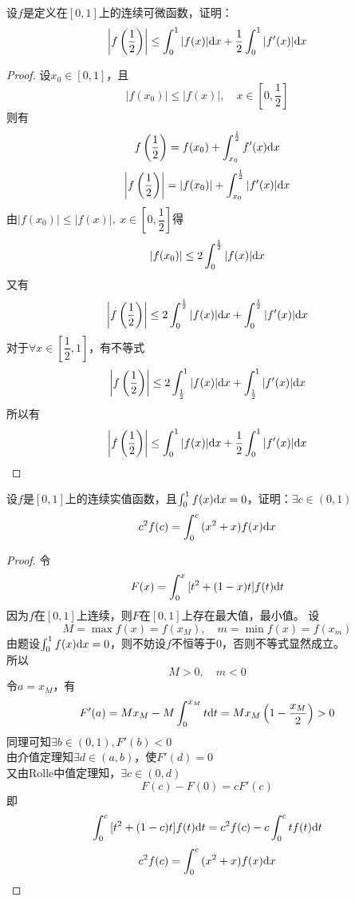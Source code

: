 \begin{proposition}
    
    设$f$是定义在$[0,1]$上的连续可微函数，证明：
    $$\left|f\left(\dfrac{1}{2}\right)\right| \leq \int_{0}^{1}{|f(x)|}\mathrm{d} x + \dfrac{1}{2} \int_{0}^{1}{|f'(x)|}\mathrm{d} x$$

\end{proposition}

\begin{proof}

    设$x_0 \in [0,1]$，且
    $$|f(x_0)| \leq |f(x)|, \quad x \in \left[0,\dfrac{1}{2}\right]$$
    则有
    $$f\left(\dfrac{1}{2}\right) = f(x_0) + \int_{x_0}^{\frac{1}{2}}{f'(x)}\mathrm{d} x$$
    $$\left|f\left(\dfrac{1}{2}\right)\right|= |f(x_0)| + \int_{x_0}^{\frac{1}{2}}{|f'(x)|}\mathrm{d} x$$
    由$|f(x_0)| \leq |f(x)|, \ x \in \left[0,\dfrac{1}{2}\right]$得
    $$|f(x_0)| \leq 2 \int_{0}^{\frac{1}{2}}{|f(x)|}\mathrm{d} x$$
    又有
    $$\left|f\left(\dfrac{1}{2}\right)\right| \leq 2\int_{0}^{\frac{1}{2}}{|f(x)|}\mathrm{d} x + \int_{0}^{\frac{1}{2}}{|f'(x)|}\mathrm{d} x$$
    对于$\forall x \in \left[\dfrac{1}{2}, 1\right]$，有不等式
    $$\left|f\left(\dfrac{1}{2}\right)\right| \leq 2\int_{\frac{1}{2}}^{1}{|f(x)|}\mathrm{d} x + \int_{\frac{1}{2}}^{1}{|f'(x)|}\mathrm{d} x$$
    所以有
    $$\left|f\left(\dfrac{1}{2}\right)\right| \leq \int_{0}^{1}{|f(x)|}\mathrm{d} x + \dfrac{1}{2} \int_{0}^{1}{|f'(x)|}\mathrm{d} x$$

\end{proof}

\begin{proposition}

    设$f$是$[0,1]$上的连续实值函数，且$\int_{0}^{1}{f(x)}\mathrm{d} x = 0$，证明：$\exists c \in (0,1)$
    $$c^2f(c) = \int_{0}^{c}{(x^2 + x)f(x)}\mathrm{d} x$$

\end{proposition}

\begin{proof}
    
    令
    $$F(x) = \int_{0}^{x}{[t^2 + (1 - x)t]f(t)}\mathrm{d} t$$
    因为$f$在$[0,1]$上连续，则$F$在$[0,1]$上存在最大值，最小值。
    设
    $$M = \max{f(x)} = f(x_M),\quad m = \min{f(x)} = f(x_m)$$
    由题设$\int_{0}^{1}{f(x)}\mathrm{d} x = 0$，则不妨设$f$不恒等于$0$，否则不等式显然成立。\\
    所以
    $$M > 0, \quad m < 0$$
    令$a = x_M$，有
    $$F'(a) = Mx_M - M\int_{0}^{x_M}{t}\mathrm{d} t = Mx_M \left(1 - \dfrac{x_M}{2} \right) > 0$$
    同理可知$\exists b \in (0,1), F'(b) < 0$\\
    由介值定理知$\exists d \in (a,b)$，使$F'(d) = 0$\\
    又由\textup{Rolle}中值定理知，$\exists c \in (0,d)$
    $$F(c) - F(0) = cF'(c)$$
    即
    $$\int_{0}^{c}{[t^2 + (1 - c)t]f(t)}\mathrm{d} t =  c^2f(c) - c\int_{0}^{c}{tf(t)}\mathrm{d} t$$
    $$c^2f(c) = \int_{0}^{c}{(x^2 + x)f(x)}\mathrm{d} x$$

\end{proof}

